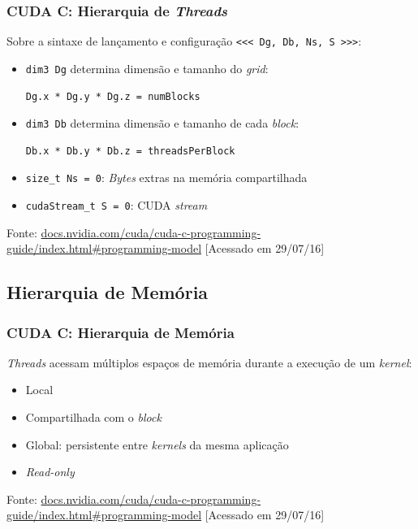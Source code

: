 \documentclass[10pt, compress]{beamer}
\begin{document}
\begin{frame}[fragile]
    \frametitle{CUDA C: Hierarquia de \textit{Threads}}
    Sobre a sintaxe de lançamento e configuração \texttt{\scriptsize{\alert{<<<} Dg, Db, Ns, S \alert{>>>}}}:
    \begin{itemize}
        \item \texttt{\alert{dim3} Dg} determina dimensão e tamanho do \textit{grid}:
\begin{lstlisting}
Dg.x * Dg.y * Dg.z = numBlocks
\end{lstlisting}
        \pause
        \item \texttt{\alert{dim3} Db} determina dimensão e tamanho de cada \textit{block}:
\begin{lstlisting}
Db.x * Db.y * Db.z = threadsPerBlock
\end{lstlisting}
        \pause
        \item \texttt{\alert{size\_t} Ns = 0}: \textit{Bytes} extras na memória compartilhada
        \item \texttt{\alert{cudaStream\_t} S = 0}: CUDA \textit{stream}
    \end{itemize}

    \vfill

    \begin{center}
        \tiny{Fonte: \url{docs.nvidia.com/cuda/cuda-c-programming-guide/index.html\#programming-model} [Acessado em 29/07/16]}
    \end{center}
\end{frame}

\subsection{Hierarquia de Memória}

\begin{frame}
    \frametitle{CUDA C: Hierarquia de Memória}
    \textit{Threads} acessam \alert{múltiplos espaços de memória} durante a execução de
    um \textit{kernel}:
    \begin{itemize}
        \item Local
            \pause
        \item Compartilhada com o \textit{block}
            \pause
        \item Global\pause: persistente entre \textit{kernels} da \alert{mesma aplicação}
            \pause
        \item \textit{Read-only}
    \end{itemize}
    \vfill

    \begin{center}
        \tiny{Fonte: \url{docs.nvidia.com/cuda/cuda-c-programming-guide/index.html\#programming-model} [Acessado em 29/07/16]}
    \end{center}
\end{frame}
\end{document}

